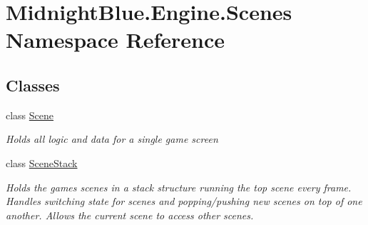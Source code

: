 \hypertarget{namespace_midnight_blue_1_1_engine_1_1_scenes}{}\section{Midnight\+Blue.\+Engine.\+Scenes Namespace Reference}
\label{namespace_midnight_blue_1_1_engine_1_1_scenes}
\subsection*{Classes}
\begin{DoxyCompactItemize}
\item 
class \hyperlink{class_midnight_blue_1_1_engine_1_1_scenes_1_1_scene}{Scene}
\begin{DoxyCompactList}\small\item\em Holds all logic and data for a single game screen \end{DoxyCompactList}\item 
class \hyperlink{class_midnight_blue_1_1_engine_1_1_scenes_1_1_scene_stack}{Scene\+Stack}
\begin{DoxyCompactList}\small\item\em Holds the games scenes in a stack structure running the top scene every frame. Handles switching state for scenes and popping/pushing new scenes on top of one another. Allows the current scene to access other scenes. \end{DoxyCompactList}\end{DoxyCompactItemize}
